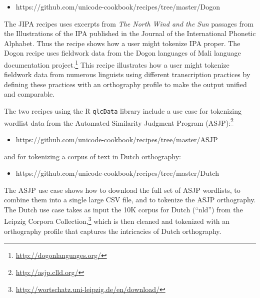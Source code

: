 \begin{itemize}
	\item https://github.com/unicode-cookbook/recipes/tree/master/Dogon
\end{itemize}

\noindent The JIPA recipes uses excerpts from \textit{The North Wind and the Sun} passages from the Illustrations of the IPA published in the Journal of the International Phonetic Alphabet. Thus the recipe shows how a user might tokenize IPA proper. The Dogon recipe uses fieldwork data from the Dogon languages of Mali language documentation project.\footnote{\url{http://dogonlanguages.org/}} This recipe illustrates how a user might tokenize fieldwork data from numerous linguists using different transcription practices by defining these practices with an orthography profile to make the output unified and comparable.

The two recipes using the R \texttt{qlcData} library include a use case for tokenizing wordlist data from the Automated Similarity Judgment Program (ASJP):\footnote{\url{http://asjp.clld.org/}}

\begin{itemize}
	\item https://github.com/unicode-cookbook/recipes/tree/master/ASJP
\end{itemize}

\noindent and for tokenizing a corpus of text in Dutch orthography:

\begin{itemize}
	\item https://github.com/unicode-cookbook/recipes/tree/master/Dutch
\end{itemize}

\noindent The ASJP use case shows how to download the full set of ASJP wordlists, to combine them into a single large CSV file, and to tokenize the ASJP orthography. The Dutch use case takes as input the 10K corpus for Dutch (``nld'') from the Leipzig Corpora Collection,\footnote{\url{http://wortschatz.uni-leipzig.de/en/download/}} which is then cleaned and tokenized with an orthography profile that captures the intricacies of Dutch orthography.


